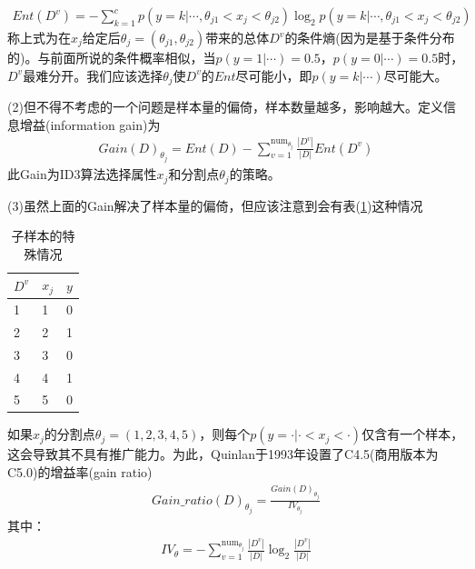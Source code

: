             \begin{align*}
            Ent(D^v) = -\sum_{k=1}^c p(y=k|\cdots,\theta_{j1}<x_j<\theta_{j2}) \log_2 p(y=k|\cdots,\theta_{j1}<x_j<\theta_{j2})
            \end{align*}
            称上式为在$x_j$给定后$\theta_j=(\theta_{j1},\theta_{j2})$带来的总体$D^v$的条件熵(因为是基于条件分布的)。与前面所说的条件概率相似，当$p(y=1|\cdots)=0.5$，$p(y=0|\cdots)=0.5$时，$D^v$最难分开。我们应该选择$\theta_j$使$D^v$的$Ent$尽可能小，即$p(y=k|\cdots)$尽可能大。
            \par
            (2)但不得不考虑的一个问题是样本量的偏倚，样本数量越多，影响越大。定义信息增益(information gain)为
            \begin{align*}
            Gain(D)_{\theta_j} = Ent(D) - \sum_{v=1}^{\mathrm{num}_{\theta_j}}\frac{|D^v|}{|D|}Ent(D^v)
            \end{align*}
            此Gain为ID3算法选择属性$x_j$和分割点$\theta_j$的策略。
            \par
            (3)虽然上面的Gain解决了样本量的偏倚，但应该注意到会有表(\ref{子样本的特殊情况})这种情况
            \begin{table}[H]
            \caption{子样本的特殊情况}
            \label{子样本的特殊情况}
            \centering
            \begin{tabular}{l|ll}
            \toprule
            $D^v$   & $x_j$    & $y$   \\
            \midrule
            1      & 1      & 0   \\
            2      & 2      & 1   \\
            3      & 3      & 0  \\
            4      & 4      & 1   \\
            5      & 5      & 0   \\
            \bottomrule
            \end{tabular}
            \end{table}
            如果$x_j$的分割点$\theta_j = (1,2,3,4,5)$，则每个$p(y=\cdot|\cdot<x_j<\cdot)$仅含有一个样本，这会导致其不具有推广能力。为此，Quinlan于1993年设置了C4.5(商用版本为C5.0)的增益率(gain ratio)
            \begin{align*}
            Gain\_ratio(D)_{\theta_j} = \frac{Gain(D)_{\theta_j}}{IV_{\theta_j}}
            \end{align*}
            其中：
            \begin{align*}
            IV_\theta = -\sum_{v=1}^{\mathrm{num}_{\theta_j}}\frac{|D^v|}{|D|}\log_2\frac{|D^v|}{|D|}
            \end{align*}
